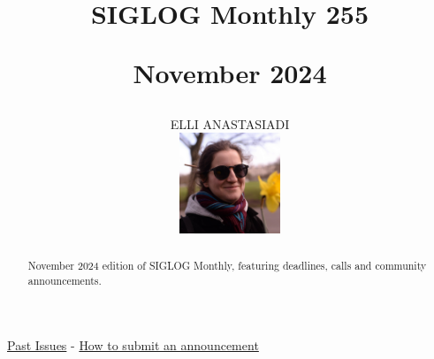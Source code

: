 \documentclass[prodmode,acmtecs]{acmsmall} %
\newcounter{colstart}
\begin{document}
\setcounter{colstart}{\thepage}

\title{{\huge\sc SIGLOG Monthly 255}

 November 2024}\author{ELLI ANASTASIADI\vspace*{-2.6cm}\begin{flushright}\includegraphics[width=30mm]{elli_anastasiadi.png}\end{flushright}}\begin{abstract}November 2024 edition of SIGLOG Monthly, featuring deadlines, calls and community announcements.
\end{abstract}


\maketitlee

\href{https://lics.siglog.org/newsletters/}{Past Issues}
 - 
\href{https://lics.siglog.org/newsletters/inst.html}{How to submit an announcement}
\end{document}
